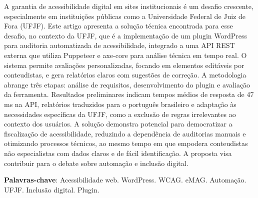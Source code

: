 \documentclass[
	article,			%
	12pt,				%
	oneside,			%
	a4paper,			%
	section=TITLE,		%
	subsection=TITLE,	%
	english,			%
	brazil,				%
	sumario=tradicional
	]{abntex2}
\begin{document}

\frenchspacing


%
%

\maketitle





\begin{resumoumacoluna}
    A garantia de acessibilidade digital em sites institucionais é um desafio
    crescente, especialmente em instituições públicas como a Universidade Federal
    de Juiz de Fora (UFJF). Este artigo apresenta a solução
    técnica encontrada para esse desafio, no contexto da UFJF, que é a
    implementação de um plugin WordPress para auditoria automatizada de acessibilidade,
    integrado a uma API REST externa que utiliza Puppeteer e axe-core para análise
    técnica em tempo real. O sistema permite avaliações personalizadas, focando em
    elementos editáveis por conteudistas, e gera relatórios claros com sugestões de
    correção. A metodologia abrange três etapas: análise de requisitos,
    desenvolvimento do plugin e avaliação da ferramenta. Resultados preliminares
    indicam tempos médios de resposta de 47 ms na API, relatórios traduzidos para o
    português brasileiro e adaptação às necessidades específicas da UFJF, como a
    exclusão de regras irrelevantes ao contexto dos usuários. A solução demonstra
    potencial para democratizar a fiscalização de acessibilidade, reduzindo a
    dependência de auditorias manuais e otimizando processos técnicos, ao mesmo tempo em 
    que empodera conteudistas não especialistas com dados claros e de fácil
    identificação. A proposta visa contribuir para o debate sobre automação e
    inclusão digital.

    \vspace{\onelineskip}

    \noindent
    \textbf{Palavras-chave}: Acessibilidade web. WordPress. WCAG. eMAG. Automação. UFJF. Inclusão digital. Plugin.
    \vspace{\onelineskip}
\end{resumoumacoluna}
\end{document}
